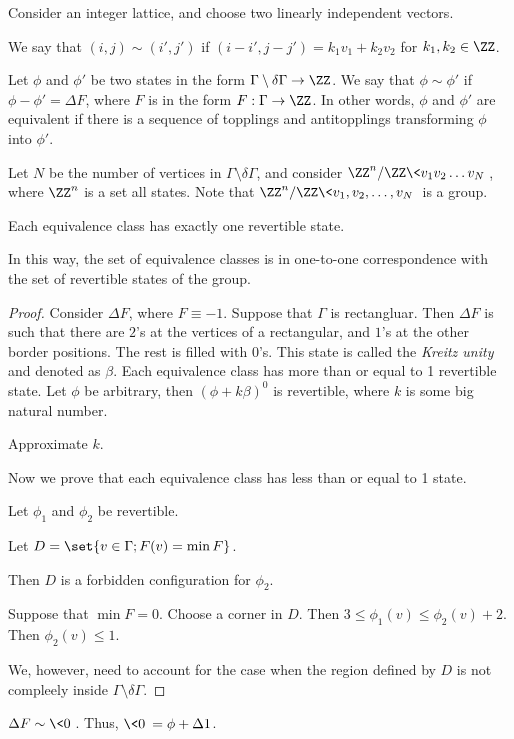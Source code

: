 \documentclass[11pt]{scrartcl}
\begin{document}
  Consider an integer lattice, and choose two linearly independent vectors.

  We say that $(i, j) \sim (i', j')$ if
  $(i-i', j-j') = k_{1}v_{1} + k_{2}v_{2}$ for $k_{1}, k_{2} \in \ZZ$.

  Let $\phi$ and $\phi'$ be two states in the form
  $\Gamma \setminus \delta\Gamma \to \ZZ$. We say that
  $\phi \sim \phi'$ if $\phi - \phi' = \Delta F$, where $F$ is in the
  form $F:\Gamma \to \ZZ$. In other words, $\phi$ and $\phi'$ are
  equivalent if there is a sequence of topplings and antitopplings
  transforming $\phi$ into $\phi'$.

  Let $N$ be the number of vertices in
  $\Gamma \setminus \delta\Gamma$, and consider
  $\ZZ^{n} / \ZZ\< v_{1}v_{2}\dots v_{N}\>$, where $\ZZ^{n}$ is a set
  all states. Note that $\ZZ^{n} / \ZZ\< v_{1},v_{2},\dots, v_{N}\>$ is a
  group.

  \begin{lemma}
    Each equivalence class has exactly one revertible state.
  \end{lemma}
  \begin{note*}
    In this way, the set of equivalence classes is in one-to-one
    correspondence with the set of revertible states of the group.
  \end{note*}

  \begin{proof}
    \hfill

    Consider $\Delta F$, where $F \equiv -1$. Suppose that $\Gamma$ is
    rectangluar. Then $\Delta F$ is such that there are $2$'s at the
    vertices of a rectangular, and $1$'s at the other border
    positions. The rest is filled with $0$'s. This state is called the
    \textit{Kreitz unity} and denoted as $\beta$. Each equivalence
    class has more than or equal to 1 revertible state. Let $\phi$ be arbitrary,
    then $(\phi + k\beta)^{0}$ is revertible, where $k$ is some big
    natural number.

    \begin{exercise}

      Approximate $k$.

    \end{exercise}

    Now we prove that each equivalence class has less than or equal to
    1 state.

    Let $\phi_{1}$ and $\phi_{2}$ be revertible.

    Let $D = \set{v \in \Gamma; F(v) = \min F}$.

    Then $D$ is a forbidden configuration for $\phi_{2}$.

    Suppose that $\min F = 0$. Choose a corner in $D$. Then
    $3 \leq \phi_{1}(v) \leq \phi_{2}(v) + 2$. Then
    $\phi_{2}(v) \leq 1$.

    We, however, need to account for the case when the region defined
    by $D$ is not compleely inside $\Gamma\setminus\delta\Gamma$.
  \end{proof}
  \begin{note*}
    $\Delta F \sim \< 0 \>$. Thus, $\< 0 \> = \phi + \Delta 1$.
  \end{note*}
\end{document}
